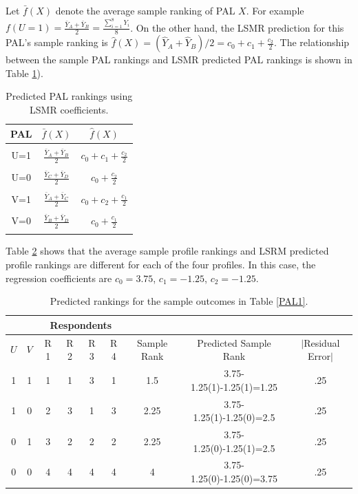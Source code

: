\documentclass[a4paper, 12pt]{article}
\begin{document}
Let $\bar{f}(X)$ denote the average sample ranking of PAL $X$. For example $f(U=1)=\frac{\bar{Y}_A+\bar{Y}_B}{2}=\frac{\sum_{i=1}^8 Y_i}{8}$.  On the other hand, the LSMR prediction for this PAL's sample ranking is $\hat{f}(X)=(\hat{Y}_A+\hat{Y}_B)/2=c_0+c_1+\frac{c_2}{2}.$ The relationship between the sample PAL rankings and LSMR predicted PAL rankings is shown in Table \ref{LSMR}).



\begin{table}[!htpb]
	\centering
	\scriptsize
	\begin{tabular}{c|c|c}
		PAL & $\bar{f}(X)$ & $ \hat{f}(X)$ \\ \hline 
		& & \\
		U=1 & $\frac{\bar{Y}_A+\bar{Y}_B}{2}$  &$c_0+c_1+\frac{c_2}{2}$\\
			& & \\
		U=0 & $ \frac{\bar{Y}_C+\bar{Y}_D}{2}$  &$c_0+\frac{c_2}{2}$ \\
			& & \\
		V=1 &$\frac{\bar{Y}_A+\bar{Y}_C}{2}$  &$c_0+c_2+\frac{c_1}{2}$ \\
			& & \\
		V=0 & $\frac{\bar{Y}_B+\bar{Y}_D}{2}$  &$c_0+\frac{c_1}{2}$  \\
		& & \\\hline
	\end{tabular}
	\caption{{\small Predicted PAL rankings using LSMR coefficients.}}
	\label{LSMR}
\end{table}

Table \ref{Tab9} shows that the average sample profile rankings and LSRM predicted profile rankings are different for each of the four profiles. In this case, the regression coefficients are $c_0=3.75$, $c_1=-1.25$, $c_2=-1.25$. 

\begin{table}[!htpb]
	\centering
	\scriptsize
	\begin{tabular}{cc|cccc|c|c|c}
		\multicolumn{2}{c}{} &\multicolumn{4}{c}{Respondents}\\\hline
		$U$ & $V$ & R 1&  R 2& R 3& R 4 &Sample Rank&Predicted Sample Rank& $\mid$Residual Error$|$\\  \hline
		1 &1&1&1&3&1&1.5&3.75-1.25(1)-1.25(1)=1.25&.25\\
		1 &0&2&3&1&3&2.25&3.75-1.25(1)-1.25(0)=2.5&.25 \\
		0 &1&3&2&2&2&2.25 &3.75-1.25(0)-1.25(1)=2.5&.25 \\
		0 &0&4&4&4&4&4 &3.75-1.25(0)-1.25(0)=3.75&.25\\\hline
	\end{tabular}
	\caption{{\small Predicted rankings for the sample outcomes in Table \ref{PAL1}.}}
	\label{Tab9}
\end{table}
\end{document}

